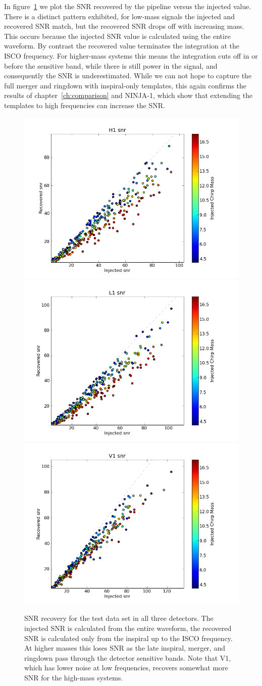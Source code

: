 In figure~\ref{f:test_recovered_snr} we plot the SNR recovered by the
pipeline versus the injected value.  There is a distinct pattern
exhibited, for low-mass signals the injected and recovered SNR match,
but the recovered SNR drops off with increasing mass.  This occurs
because the injected SNR value is calculated using the entire
waveform.  By contrast the recovered value terminates the integration
at the ISCO frequency.  For higher-mass systems this means the
integration cuts off in or before the sensitive band, while there is
still power in the signal, and consequently the SNR is underestimated.
While we can not hope to capture the full merger and ringdown with
inspiral-only templates, this again confirms the results of
chapter~\ref{ch:comparison} and NINJA-1, which show that extending the
templates to high frequencies can increase the SNR.

\begin{figure}
  \includegraphics[width=0.5\linewidth]{figures/ninja2_results/h1_snrs_second}
  \includegraphics[width=0.5\linewidth]{figures/ninja2_results/l1_snrs_second} \\
  \includegraphics[width=0.5\linewidth]{figures/ninja2_results/v1_snrs_second}
  \caption[SNR recovery for the test data set]{
  \label{f:test_recovered_snr}
SNR recovery for the test data set in all three detectors.  The
injected SNR is calculated from the entire waveform, the recovered SNR
is calculated only from the inspiral up to the ISCO frequency.  At
higher masses this loses SNR as the late inspiral, merger, and
ringdown pass through the detector sensitive bands.  Note that V1,
which has lower noise at low frequencies, recovers somewhat more SNR
for the high-mass systems.
}
\end{figure}%


